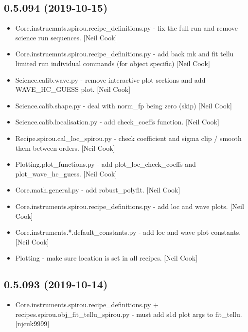 \documentclass[a4paper,10pt,english]{report}
\begin{document}
\subsection{0.5.094 (2019-10-15)}
\label{\detokenize{misc/changelog:id47}}\begin{itemize}
\item {} 
Core.instruemnts.spirou.recipe\_definitions.py - fix the full run and
remove science run sequences. {[}Neil Cook{]}

\item {} 
Core.instruemnts.spirou.recipe\_definitions.py - add back mk and fit
tellu limited run individual commands (for object specific) {[}Neil
Cook{]}

\item {} 
Science.calib.wave.py - remove interactive plot sections and add
WAVE\_HC\_GUESS plot. {[}Neil Cook{]}

\item {} 
Science.calib.shape.py - deal with norm\_fp being zero (skip) {[}Neil
Cook{]}

\item {} 
Science.calib.localisation.py - add check\_coeffs function. {[}Neil Cook{]}

\item {} 
Recipe.spirou.cal\_loc\_spirou.py - check coefficient and sigma clip /
smooth them between orders. {[}Neil Cook{]}

\item {} 
Plotting.plot\_functions.py - add plot\_loc\_check\_coeffs and
plot\_wave\_hc\_guess. {[}Neil Cook{]}

\item {} 
Core.math.general.py - add robust\_polyfit. {[}Neil Cook{]}

\item {} 
Core.instruments.spirou.recipe\_definitions.py - add loc and wave
plots. {[}Neil Cook{]}

\item {} 
Core.instruments.*.default\_constants.py - add loc and wave plot
constants. {[}Neil Cook{]}

\item {} 
Plotting - make sure location is set in all recipes. {[}Neil Cook{]}

\end{itemize}


\subsection{0.5.093 (2019-10-14)}
\label{\detokenize{misc/changelog:id48}}\begin{itemize}
\item {} 
Core.instruments.spirou.recipe\_definitions.py +
recipes.spirou.obj\_fit\_tellu\_spirou.py - must add s1d plot args to
fit\_tellu. {[}njcuk9999{]}

\end{itemize}
\end{document}
